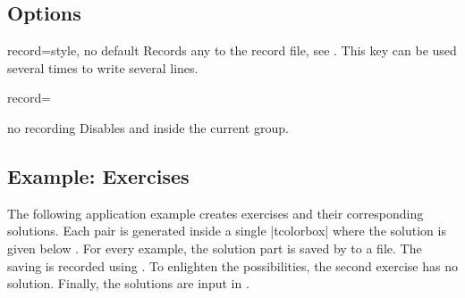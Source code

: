 \subsection{Options}\label{sec:recording-options}
\begin{docTcbKey}[][doc new=2014-11-28]{record}{=}{style, no default}
  Records any  to the record file, see .
  This key can be used several times to write several lines.
  \begin{dispListing}
  record={\string{}}
  \end{dispListing}
\end{docTcbKey}

\begin{docTcbKey}[][doc new=2014-11-28]{no recording}{}{}
  Disables  and  inside the current
  group.
\end{docTcbKey}


\clearpage
\subsection{Example: Exercises}\label{sec:recording-exercises}
The following application example creates exercises and their corresponding
solutions. Each pair is generated inside a single |tcolorbox| where the
solution is given below . For every example, the solution part
is saved by  to a file. The saving is recorded using
. To enlighten the possibilities, the second exercise
has no solution. Finally, the solutions are input in .


